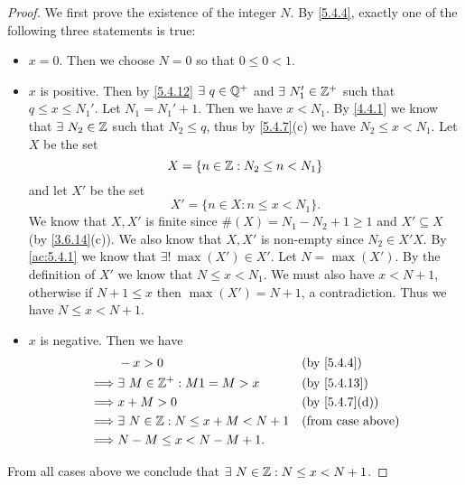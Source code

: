\begin{proof}
  We first prove the existence of the integer \(N\).
  By \cref{5.4.4}, exactly one of the following three statements is true:
  \begin{itemize}
    \item \(x = 0\).
          Then we choose \(N = 0\) so that \(0 \leq 0 < 1\).
    \item \(x\) is positive.
          Then by \cref{5.4.12} \(\exists\ q \in \Q^+\) and \(\exists\ N_1' \in \mathbb{Z}^+\) such that \(q \leq x \leq N_1'\).
          Let \(N_1 = N_1' + 1\).
          Then we have \(x < N_1\).
          By \cref{4.4.1} we know that \(\exists\ N_2 \in \mathbb{Z}\) such that \(N_2 \leq q\), thus by \cref{5.4.7}(c) we have \(N_2 \leq x < N_1\).
          Let \(X\) be the set
          \[
            X = \{n \in \mathbb{Z} : N_2 \leq n < N_1\}
          \]
          and let \(X'\) be the set
          \[
            X' = \{n \in X : n \leq x < N_1\}.
          \]
          We know that \(X, X'\) is finite since \(\#(X) = N_1 - N_2 + 1 \geq 1\) and \(X' \subseteq X\) (by \cref{3.6.14}(c)).
          We also know that \(X, X'\) is non-empty since \(N_2 \in X'X\).
          By \cref{ac:5.4.1} we know that \(\exists!\ \max(X') \in X'\).
          Let \(N = \max(X')\).
          By the definition of \(X'\) we know that \(N \leq x < N_1\).
          We must also have \(x < N + 1\), otherwise if \(N + 1 \leq x\) then \(\max(X') = N + 1\), a contradiction.
          Thus we have \(N \leq x < N + 1\).
    \item \(x\) is negative.
          Then we have
          \begin{align*}
                     & -x > 0                                   &  & \by{5.4.4}                  \\
            \implies & \exists\ M \in \Z^+ : M1 = M > x         &  & \text{(by \cref{5.4.13})}   \\
            \implies & x + M > 0                                &  & \text{(by \cref{5.4.7}(d))} \\
            \implies & \exists\ N \in \Z : N \leq x + M < N + 1 &  & \text{(from case above)}    \\
            \implies & N - M \leq x < N - M + 1.
          \end{align*}
  \end{itemize}
  From all cases above we conclude that \(\exists\ N \in \mathbb{Z} : N \leq x < N + 1\).


\end{proof}
